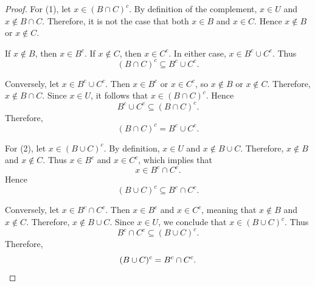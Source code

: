 \begin{proof}
   For (1), let $x \in (B \cap C)^c$. By definition of the complement, $x \in U$ and $x \notin B \cap C$. Therefore, it is not the case that both $x \in B$ and $x \in C$. Hence $x \notin B$ or $x \notin C$.

   If $x \notin B$, then $x \in B^c$. If $x \notin C$, then $x \in C^c$. In either case, $x \in B^c \cup C^c$. Thus \[(B \cap C)^c \subseteq B^c \cup C^c.\]

   Conversely, let $x \in B^c \cup C^c$. Then $x \in B^c$ or $x \in C^c$, so $x \notin B$ or $x \notin C$. Therefore, $x \notin B \cap C$. Since $x \in U$, it follows that $x \in (B \cap C)^c$. Hence \[B^c \cup C^c \subseteq (B \cap C)^c.\] Therefore, \[(B \cap C)^c = B^c \cup C^c.\]

   For (2), let $x \in (B \cup C)^c$. By definition, $x \in U$ and $x \notin B \cup C$. Therefore, $x \notin B$ and $x \notin C$. Thus $x \in B^c$ and $x \in C^c$, which implies that \[x \in B^c \cap C^c.\] Hence \[(B \cup C)^c \subseteq B^c \cap C^c.\]

   Conversely, let $x \in B^c \cap C^c$. Then $x \in B^c$ and $x \in C^c$, meaning that $x \notin B$ and $x \notin C$. Therefore, $x \notin B \cup C$. Since $x \in U$, we conclude that $x \in (B \cup C)^c$. Thus \[B^c \cap C^c \subseteq (B \cup C)^c.\] Therefore, \[(B \cup C)^c = B^c \cap C^c. \qedhere \]
\end{proof}


